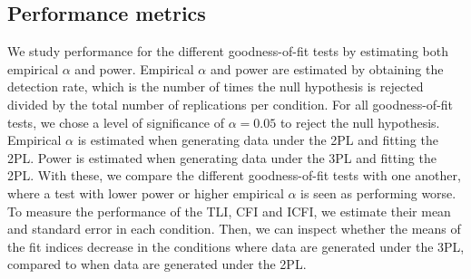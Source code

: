 \documentclass[Royal,sageapa,times,doublespace]{sagej}
\begin{document}
\subsection{Performance metrics}
We study performance for the different goodness-of-fit tests by estimating both empirical $\alpha$ and power. Empirical $\alpha$ and power are estimated by obtaining the detection rate, which is the number of times the null hypothesis is rejected divided by the total number of replications per condition. For all goodness-of-fit tests, we chose a level of significance of $\alpha = 0.05$ to reject the null hypothesis. Empirical $\alpha$ is estimated when generating data under the 2PL and fitting the 2PL. Power is estimated when generating data under the 3PL and fitting the 2PL. With these, we compare the different goodness-of-fit tests with one another, where a test with lower power or higher empirical $\alpha$ is seen as performing worse. \\
\indent To measure the performance of the TLI, CFI and ICFI, we estimate their mean and standard error in each condition. Then, we can inspect whether the means of the fit indices decrease in the conditions where data are generated under the 3PL, compared to when data are generated under the 2PL. 
\end{document}
